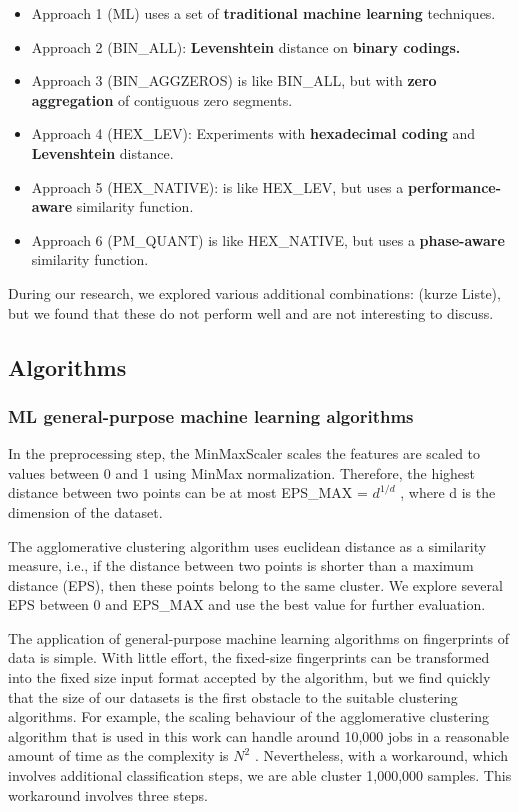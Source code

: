 \documentclass[]{llncs}
\begin{document}
\begin{itemize}
 \item Approach 1 (ML) uses a set of\textbf{ traditional machine learning} techniques. 
 \item Approach 2 (BIN\_ALL): \textbf{Levenshtein} distance on \textbf{binary codings.}
 \item Approach 3 (BIN\_AGGZEROS) is like BIN\_ALL, but with \textbf{zero aggregation }of contiguous zero segments.
 \item Approach 4 (HEX\_LEV): Experiments with \textbf{hexadecimal coding }and \textbf{Levenshtein }distance.
 \item Approach 5 (HEX\_NATIVE): is like HEX\_LEV, but uses a \textbf{performance-aware }similarity function.
 \item Approach 6 (PM\_QUANT) is like HEX\_NATIVE, but uses a \textbf{phase-aware }similarity function.
\end{itemize}

During our research, we explored various additional combinations: (kurze Liste), but we found that these do not perform well and are not interesting to discuss.

\subsection{Algorithms }
\subsubsection{ML general-purpose machine learning algorithms}
In the preprocessing step, the MinMaxScaler scales the features are scaled to values between 0 and 1 using MinMax normalization.
Therefore, the highest distance between two points can be at most EPS\_MAX =  \( d^{1/d} \) , where d is the dimension of the dataset.


The agglomerative clustering algorithm uses euclidean distance as a similarity measure, i.e., if the distance between two points is shorter than a maximum distance (EPS), then these points belong to the same cluster.
We explore several EPS between 0 and EPS\_MAX and use the best value for further evaluation.


The application of general-purpose machine learning algorithms on fingerprints of data is simple.
With little effort, the fixed-size fingerprints can be transformed into the fixed size input format accepted by the algorithm, but we find quickly that the size of our datasets is the first obstacle to the suitable clustering algorithms.
For example, the scaling behaviour of the agglomerative clustering algorithm that is used in this work can handle around 10,000 jobs in a reasonable amount of time as the complexity is  \( N^{2} \) .
Nevertheless, with a workaround, which involves additional classification steps, we are able cluster 1,000,000 samples.
This workaround involves three steps.
\end{document}
